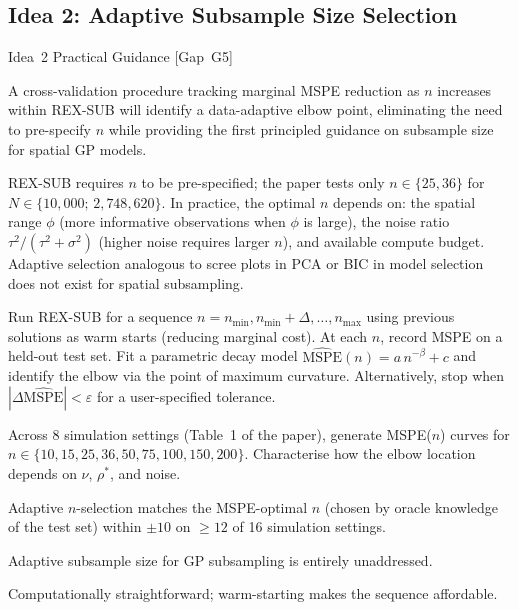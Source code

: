 \documentclass[12pt, a4paper]{article}
\newcommand{\novelty}[1]{\textbf{Novelty:} #1/5}
\newcommand{\feasibility}[1]{\textbf{Feasibility:} #1/5}
\begin{document}
\subsection{Idea 2: Adaptive Subsample Size Selection}

\begin{ideabox}{Idea~2 \textbullet{} Practical Guidance [Gap~G5]}

\begin{description}[leftmargin=5em, labelwidth=4.5em]
  \item[\textbf{Hypothesis}]
    A cross-validation procedure tracking marginal MSPE reduction as $n$ increases
    within REX-SUB will identify a data-adaptive elbow point, eliminating the need
    to pre-specify $n$ while providing the first principled guidance on subsample
    size for spatial GP models.

  \item[\textbf{Motivation}]
    REX-SUB requires $n$ to be pre-specified; the paper tests only $n \in \{25, 36\}$
    for $N \in \{10{,}000;\, 2{,}748{,}620\}$.  In practice, the optimal $n$ depends
    on: the spatial range $\phi$ (more informative observations when $\phi$ is large),
    the noise ratio $\tau^2/(\tau^2+\sigma^2)$ (higher noise requires larger $n$),
    and available compute budget.  Adaptive selection analogous to scree plots in PCA
    or BIC in model selection does not exist for spatial subsampling.

  \item[\textbf{Approach}]
    Run REX-SUB for a sequence $n = n_{\min}, n_{\min}+\Delta, \ldots, n_{\max}$
    using previous solutions as warm starts (reducing marginal cost).  At each $n$,
    record MSPE on a held-out test set.  Fit a parametric decay model
    $\widehat{\text{MSPE}}(n) = a\,n^{-\beta} + c$ and identify the elbow via the
    point of maximum curvature.  Alternatively, stop when
    $|\Delta\widehat{\text{MSPE}}| < \varepsilon$ for a user-specified tolerance.

  \item[\textbf{Key experiment}]
    Across 8 simulation settings (Table~1 of the paper), generate MSPE($n$) curves
    for $n \in \{10, 15, 25, 36, 50, 75, 100, 150, 200\}$.  Characterise how the
    elbow location depends on $\nu$, $\rho^*$, and noise.

  \item[\textbf{Success criterion}]
    Adaptive $n$-selection matches the MSPE-optimal $n$ (chosen by oracle knowledge
    of the test set) within $\pm 10$ on $\geq 12$ of 16 simulation settings.

  \item[\novelty{4}]
    Adaptive subsample size for GP subsampling is entirely unaddressed.

  \item[\feasibility{5}]
    Computationally straightforward; warm-starting makes the sequence affordable.
\end{description}

\end{ideabox}
\end{document}
